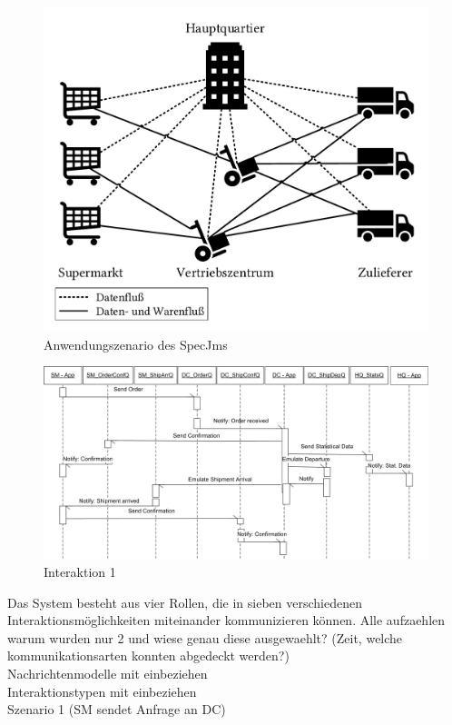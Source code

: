 \begin{figure}
\center
  \includegraphics[width=1\textwidth]{images/evaluation/specjms/specjmsOverview.pdf}
  \caption{Anwendungszenario des SpecJms}
  \label{img:specjmsInteraction}
\end{figure}
\begin{figure}
\center
  \includegraphics[width=1\textwidth]{images/Interaction1Diag.png}
  \caption{Interaktion 1}
  \label{img:specjmsInteraction1}
\end{figure}
Das System besteht aus vier Rollen, die in sieben verschiedenen Interaktionsmöglichkeiten miteinander kommunizieren können. 
Alle aufzaehlen\\
warum wurden nur 2 und wiese genau diese ausgewaehlt? (Zeit, welche kommunikationsarten konnten abgedeckt werden?)\\
Nachrichtenmodelle mit einbeziehen \\
Interaktionstypen mit einbeziehen \\
Szenario 1 (SM sendet Anfrage an DC)

